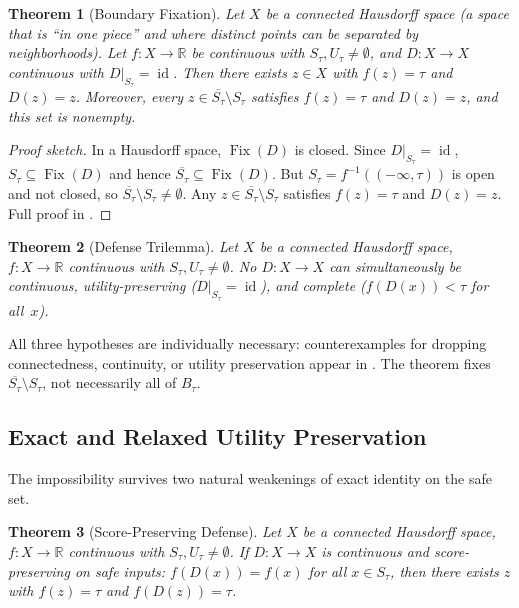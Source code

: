 \documentclass[11pt]{article}
\newtheorem{theorem}{Theorem}[section]
\newcommand{\R}{\mathbb{R}}
\newcommand{\cl}[1]{\overline{#1}}
\newcommand{\Fix}{\operatorname{Fix}}
\newcommand{\id}{\operatorname{id}}
\begin{document}
\begin{theorem}[Boundary Fixation]
\label{thm:main}
Let $X$ be a connected Hausdorff space (a space that is ``in one
piece'' and where distinct points can be separated by neighborhoods).
Let $f\colon X\to\R$ be continuous with $S_\tau, U_\tau \neq
\emptyset$, and $D\colon X \to X$ continuous with
$D|_{S_\tau} = \id$. Then there exists $z\in X$ with $f(z) = \tau$
and $D(z) = z$. Moreover, every $z \in \cl{S_\tau} \setminus S_\tau$
satisfies $f(z) = \tau$ and $D(z) = z$, and this set is nonempty.
\end{theorem}

\begin{proof}[Proof sketch]
In a Hausdorff space, $\Fix(D)$ is closed. Since $D|_{S_\tau}=\id$,
$S_\tau \subseteq \Fix(D)$ and hence $\cl{S_\tau}\subseteq \Fix(D)$.
But $S_\tau=f^{-1}((-\infty,\tau))$ is open and not closed, so
$\cl{S_\tau}\setminus S_\tau \neq \emptyset$. Any
$z \in \cl{S_\tau}\setminus S_\tau$ satisfies $f(z)=\tau$ and $D(z)=z$.
Full proof in .
\end{proof}

\begin{theorem}[Defense Trilemma]
\label{thm:trilemma}
Let $X$ be a connected Hausdorff space, $f\colon X \to \R$ continuous
with $S_\tau, U_\tau \neq \emptyset$. No $D\colon X \to X$ can
simultaneously be continuous, utility-preserving ($D|_{S_\tau} = \id$),
and complete ($f(D(x)) < \tau$ for all~$x$).
\end{theorem}

All three hypotheses are individually necessary: counterexamples for
dropping connectedness, continuity, or utility preservation appear in
. The theorem fixes
$\cl{S_\tau}\setminus S_\tau$, not necessarily all of $B_\tau$.


\subsection{Exact and Relaxed Utility Preservation}
\label{sec:relaxed}

The impossibility survives two natural weakenings of exact identity on
the safe set.

\begin{theorem}[Score-Preserving Defense]
\label{thm:score-preserving}
Let $X$ be a connected Hausdorff space, $f\colon X\to\R$ continuous
with $S_\tau, U_\tau \neq \emptyset$. If $D\colon X \to X$ is
continuous and \emph{score-preserving on safe inputs}:
$f(D(x)) = f(x)$ for all $x \in S_\tau$, then there exists $z$ with
$f(z) = \tau$ and $f(D(z)) = \tau$.
\end{theorem}
\end{document}
